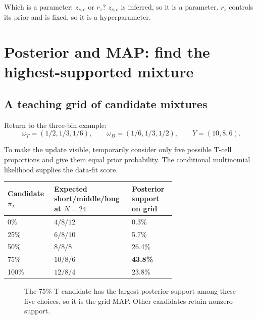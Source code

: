 \documentclass[11pt]{article}
\begin{document}
\begin{checkpoint}
Which is a parameter: \(z_{s,c}\) or \(r_z\)? \(z_{s,c}\) is inferred, so it is a
parameter. \(r_z\) controls its prior and is fixed, so it is a hyperparameter.
\end{checkpoint}

\section{Posterior and MAP: find the highest-supported mixture}

\subsection{A teaching grid of candidate mixtures}

Return to the three-bin example:
\[
\omega_T=(1/2,1/3,1/6),\qquad
\omega_B=(1/6,1/3,1/2),\qquad
Y=(10,8,6).
\]

To make the update visible, temporarily consider only five possible T-cell
proportions and give them equal prior probability. The conditional multinomial
likelihood supplies the data-fit score.

\begin{center}
\begin{tabular}{C{0.16\linewidth}C{0.28\linewidth}C{0.22\linewidth}}
\toprule
Candidate \(\pi_T\) & Expected short/middle/long at \(N=24\) & Posterior support on grid \\
\% & \(4/8/12\) & 0.3\% \\
25\% & \(6/8/10\) & 5.7\% \\
50\% & \(8/8/8\) & 26.4\% \\
75\% & \(10/8/6\) & \textbf{43.8\%} \\
100\% & \(12/8/4\) & 23.8\% \\
\bottomrule
\end{tabular}
\end{center}

\begin{figure}[H]
\centering
{}
\caption{The 75\% T candidate has the largest posterior support among these five choices, so it is the grid MAP. Other candidates retain nonzero support.}
\end{figure}
\end{document}
